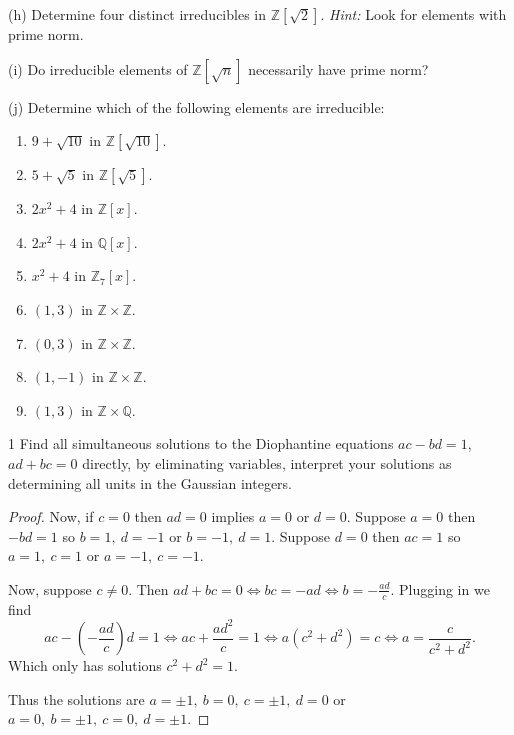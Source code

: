 \begin{problem}[Warmup]{(h)}
    Determine four distinct irreducibles in $\mathbb{Z}[\sqrt{2}]$. \emph{Hint:} Look for elements with prime norm.
\end{problem}
\unsolved

\begin{problem}[Warmup]{(i)}
    Do irreducible elements of $\mathbb{Z}[\sqrt{n}]$ necessarily have prime norm?
\end{problem}
\unsolved

\begin{problem}[Warmup]{(j)}
    Determine which of the following elements are irreducible:
    \begin{enumerate}
        \item[(a)] $9 + \sqrt{10}$ in $\mathbb{Z}[\sqrt{10}]$.
        \item[(b)] $5 + \sqrt{5}$ in $\mathbb{Z}[\sqrt{5}]$.
        \item[(c)] $2x^2 + 4$ in $\mathbb{Z}[x]$.
        \item[(d)] $2x^2 + 4$ in $\mathbb{Q}[x]$.
        \item[(e)] $x^2 + 4$ in $\mathbb{Z}_7[x]$.
        \item[(f)] $(1, 3)$ in $\mathbb{Z} \times \mathbb{Z}$.
        \item[(g)] $(0, 3)$ in $\mathbb{Z} \times \mathbb{Z}$.
        \item[(h)] $(1, -1)$ in $\mathbb{Z} \times \mathbb{Z}$.
        \item[(i)] $(1, 3)$ in $\mathbb{Z} \times \mathbb{Q}$.
    \end{enumerate}
\end{problem}
\unsolved

\begin{problem}{1}
    Find all simultaneous solutions to the Diophantine
    equations $ac - bd = 1$, $ad + bc = 0$ directly,
    by eliminating variables, interpret your solutions 
    as determining all units in the Gaussian integers.
\end{problem}
\solved

\begin{proof}
    Now, if $c = 0$ then $ad = 0$ implies $a = 0$ or $d = 0$.
    Suppose $a = 0$ then $-bd = 1$ so $b = 1,\ d = -1$
    or $b = -1,\ d = 1$.
    Suppose $d = 0$ then $ac = 1$ so $a = 1,\ c = 1$
    or $a = -1,\ c = -1$.

    Now, suppose $c \ne 0$.
    Then $ad + bc = 0 \iff bc = -ad \iff b = -\frac{ad}{c}$.
    Plugging in we find
    $$
    ac - \left(-\frac{ad}{c}\right)d = 1
    \iff ac + \frac{ad^2}{c} = 1
    \iff a(c^2 + d^2) = c
    \iff a = \frac{c}{c^2 + d^2}.
    $$
    Which only has solutions $c^2 + d^2 = 1$.

    Thus the solutions are $a = \pm 1,\ b = 0,\ c = \pm 1,\ d = 0$
    or $a = 0,\ b = \pm 1,\ c = 0,\ d = \pm 1$.
\end{proof}


